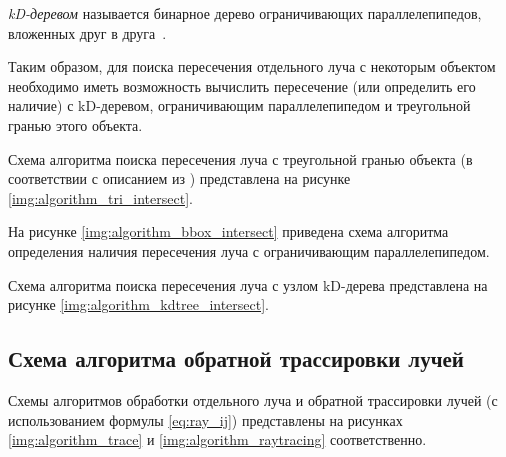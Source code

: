 \textit{kD-деревом} называется бинарное дерево ограничивающих параллелепипедов, вложенных друг в друга~\cite{боресков}.
	
Таким образом, для поиска пересечения отдельного луча с некоторым объектом необходимо иметь возможность вычислить пересечение (или определить его наличие) с kD-деревом, ограничивающим параллелепипедом и треугольной гранью этого объекта.

Схема алгоритма поиска пересечения луча с треугольной гранью объекта (в соответствии с описанием из \cite{moller2005fast}) представлена на рисунке \ref{img:algorithm_tri_intersect}.


\clearpage

На рисунке \ref{img:algorithm_bbox_intersect} приведена схема алгоритма определения наличия пересечения луча с ограничивающим параллелепипедом.


\clearpage

Схема алгоритма поиска пересечения луча с узлом kD-дерева представлена на рисунке \ref{img:algorithm_kdtree_intersect}.


\clearpage

\clearpage

\subsection{Схема алгоритма обратной трассировки лучей}

Схемы алгоритмов обработки отдельного луча и обратной трассировки лучей (с использованием формулы \ref{eq:ray_ij}) представлены на рисунках \ref{img:algorithm_trace} и \ref{img:algorithm_raytracing} соответственно.



\clearpage

